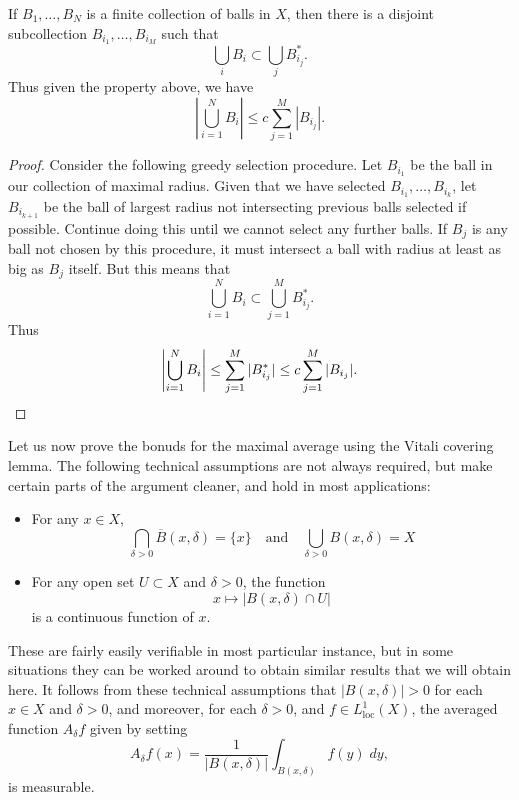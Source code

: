 \begin{lemma}
    If $B_1, \dots, B_N$ is a finite collection of balls in $X$, then there is a disjoint subcollection $B_{i_1}, \dots, B_{i_M}$ such that
    \[ \bigcup_i B_i \subset \bigcup_j B_{i_j}^*. \]
    Thus given the property above, we have
    \[ \left| \bigcup_{i = 1}^N B_i \right| \leq c \sum_{j = 1}^M |B_{i_j}|. \]
\end{lemma}
\begin{proof}
  Consider the following greedy selection procedure. Let $B_{i_1}$ be the ball in our collection of maximal radius. Given that we have selected $B_{i_1},\dots,B_{i_k}$, let $B_{i_{k+1}}$ be the ball of largest radius not intersecting previous balls selected if possible. Continue doing this until we cannot select any further balls. If $B_j$ is any ball not chosen by this procedure, it must intersect a ball with radius at least as big as $B_j$ itself. But this means that
  \[ \bigcup_{i = 1}^N B_i \subset \bigcup_{j = 1}^M B^*_{i_j}. \]
  Thus
  \[ \left| \bigcup_{i = 1}^N B_i \right| \leq \sum_{j = 1}^M |B^*_{i_j}| \leq c \sum_{j = 1}^M |B_{i_j}|. \qedhere \]
\end{proof}

Let us now prove the bonuds for the maximal average using the Vitali covering lemma. The following technical assumptions are not always required, but make certain parts of the argument cleaner, and hold in most applications:
%
\begin{itemize}
  \item For any $x \in X$,
  \[ \bigcap_{\delta > 0} \overline{B}(x,\delta) = \{ x \} \quad\text{and}\quad \bigcup_{\delta > 0} B(x,\delta) = X \]

  \item For any open set $U \subset X$ and $\delta > 0$, the function
  \[ x \mapsto |B(x,\delta) \cap U| \]
  is a continuous function of $x$.
\end{itemize}
%
These are fairly easily verifiable in most particular instance, but in some situations they can be worked around to obtain similar results that we will obtain here. It follows from these technical assumptions that $|B(x,\delta)| > 0$ for each $x \in X$ and $\delta > 0$, and moreover, for each $\delta > 0$, and $f \in L^1_{\text{loc}}(X)$, the averaged function $A_\delta f$ given by setting
%
\[ A_\delta f(x) = \frac{1}{|B(x,\delta)|} \int_{B(x,\delta)} f(y)\; dy, \]
%
is measurable.

